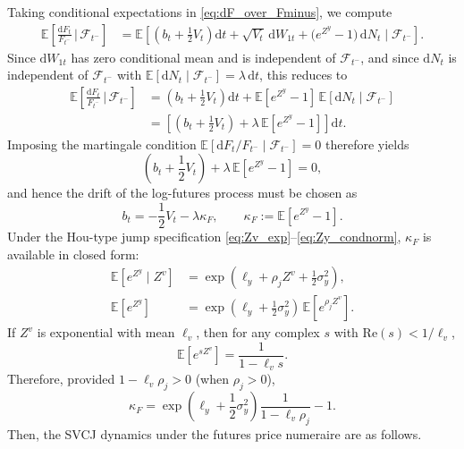 \documentclass[a4paper,titlepage,12pt]{report}
\theoremstyle{plain}
\begin{document}
Taking conditional expectations in \eqref{eq:dF_over_Fminus}, we compute
\begin{align}
\mathbb{E}\!\left[\frac{\mathrm{d}F_t}{F_{t^-}} \,\bigg|\, \mathcal{F}_{t^-}\right]
&=
\mathbb{E}\!\left[
\left(b_t + \frac{1}{2}V_t\right)\mathrm{d}t
+ \sqrt{V_t}\,\mathrm{d}W_{1t}
+ \big(e^{Z^y}-1\big)\,\mathrm{d}N_t
\;\bigg|\; \mathcal{F}_{t^-}
\right].
\end{align}
Since $\mathrm{d}W_{1t}$ has zero conditional mean and is independent of $\mathcal{F}_{t^-}$, and
since $\mathrm{d}N_t$ is independent of $\mathcal{F}_{t^-}$ with
$\mathbb{E}[\mathrm{d}N_t \mid \mathcal{F}_{t^-}] = \lambda\,\mathrm{d}t$, this reduces to
\begin{align}
\mathbb{E}\!\left[\frac{\mathrm{d}F_t}{F_{t^-}} \,\bigg|\, \mathcal{F}_{t^-}\right]
&=
\left(b_t + \frac{1}{2}V_t\right)\mathrm{d}t
+
\mathbb{E}\!\left[e^{Z^y}-1\right]\,
\mathbb{E}\!\left[\mathrm{d}N_t \mid \mathcal{F}_{t^-}\right]
\nonumber\\
&=
\left[
\left(b_t + \frac{1}{2}V_t\right)
+ \lambda\,\mathbb{E}\!\left[e^{Z^y}-1\right]
\right]\mathrm{d}t.
\label{eq:cond_expectation_drift}
\end{align}
Imposing the martingale condition
$\mathbb{E}[\mathrm{d}F_t/F_{t^-} \mid \mathcal{F}_{t^-}]=0$
therefore yields
\begin{equation}
\left(b_t + \frac{1}{2}V_t\right)
+ \lambda\,\mathbb{E}\!\left[e^{Z^y}-1\right]
= 0,
\end{equation}
and hence the drift of the log-futures process must be chosen as
\begin{equation}
\boxed{
b_t
=
-\frac{1}{2}V_t
-
\lambda \kappa_F,
\qquad
\kappa_F := \mathbb{E}\!\left[e^{Z^y}-1\right].}
\label{eq:drift_martingale}
\end{equation}
Under the Hou-type jump specification \eqref{eq:Zv_exp}--\eqref{eq:Zy_condnorm}, $\kappa_F$ is available in closed form:
\begin{align}
\mathbb{E}\!\left[e^{Z^y}\mid Z^v\right]
&=
\exp\!\left(\ell_y + \rho_j Z^v + \frac{1}{2}\sigma_y^2\right),
\\
\mathbb{E}\!\left[e^{Z^y}\right]
&=
\exp\!\left(\ell_y + \frac{1}{2}\sigma_y^2\right)\,
\mathbb{E}\!\left[e^{\rho_j Z^v}\right].
\end{align}
If $Z^v$ is exponential with mean $\ell_v$, then for any complex $s$ with $\mathrm{Re}(s) < 1/\ell_v$,
\begin{equation}
\mathbb{E}[e^{s Z^v}] = \frac{1}{1-\ell_v s}.
\end{equation}
Therefore, provided $1-\ell_v\rho_j>0$ (when $\rho_j>0$),
\begin{equation}
\boxed{
\kappa_F
=
\exp\!\left(\ell_y + \frac{1}{2}\sigma_y^2\right)\frac{1}{1-\ell_v\rho_j} - 1.}
\label{eq:kappaF_closed}
\end{equation}
Then, the SVCJ dynamics under the futures price numeraire are as follows.
\end{document}
